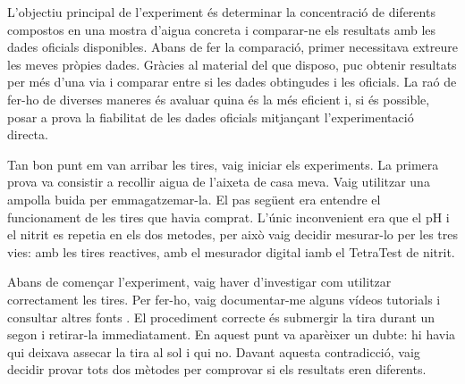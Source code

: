 
L’objectiu principal de l'experiment és determinar la concentració de diferents compostos en una mostra d’aigua concreta i comparar-ne els resultats amb les dades oficials disponibles. Abans de fer la comparació, primer necessitava extreure les meves pròpies dades. Gràcies al material del que disposo, puc obtenir resultats per més d’una via i comparar entre si les dades obtingudes i les oficials. La raó de fer-ho de diverses maneres és avaluar quina és la més eficient i, si és possible, posar a prova la fiabilitat de les dades oficials mitjançant l’experimentació directa.

Tan bon punt em van arribar les tires, vaig iniciar els experiments. La primera prova va consistir a recollir aigua de l’aixeta de casa meva. Vaig utilitzar una ampolla buida per emmagatzemar-la. El pas següent era entendre el funcionament de les tires que havia comprat. L’únic inconvenient era que el pH i el nitrit es repetia en els dos metodes, per això vaig decidir mesurar-lo per les tres vies: amb les tires reactives, amb el mesurador digital iamb el TetraTest de nitrit.


Abans de començar l'experiment, vaig haver d’investigar com utilitzar correctament les tires. Per fer-ho, vaig documentar-me alguns vídeos tutorials \cite{VideosDeSuport} i consultar altres fonts \cite{FontsPerTires}. El procediment correcte és submergir la tira durant un segon i retirar-la immediatament. En aquest punt va aparèixer un dubte: hi havia qui deixava assecar la tira al sol i qui no. Davant aquesta contradicció, vaig decidir provar tots dos mètodes per comprovar si els resultats eren diferents.

